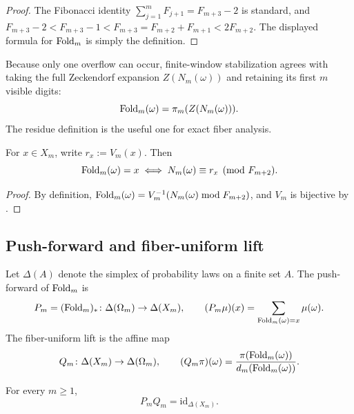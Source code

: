 \begin{proof}
The Fibonacci identity
\(\sum_{j=1}^m F_{j+1}=F_{m+3}-2\) is standard, and
\(F_{m+3}-2<F_{m+3}-1<F_{m+3}=F_{m+2}+F_{m+1}<2F_{m+2}\).  The displayed
formula for \(\mathrm{Fold}_m\) is simply the definition.
\end{proof}

\begin{remark}
\label{rem:prefix-normalization}
Because only one overflow can occur, finite-window stabilization agrees with
taking the full Zeckendorf expansion \(Z(N_m(\omega))\) and retaining its first
\(m\) visible digits:
\[
  \mathrm{Fold}_m(\omega)=\pi_m(Z(N_m(\omega))).
\]
The residue definition is the useful one for exact fiber analysis.
\end{remark}

\begin{corollary}
\label{cor:residue-characterization}
For \(x\in X_m\), write \(r_x:=V_m(x)\).  Then
\[
  \mathrm{Fold}_m(\omega)=x
  \iff
  N_m(\omega)\equiv r_x \pmod{F_{m+2}}.
\]
\end{corollary}

\begin{proof}
By definition,
\(\mathrm{Fold}_m(\omega)=V_m^{-1}(N_m(\omega)\bmod F_{m+2})\), and \(V_m\) is
bijective by .
\end{proof}

\subsection{Push-forward and fiber-uniform lift}

\begin{definition}
\label{def:pushforward-lift}
Let \(\Delta(A)\) denote the simplex of probability laws on a finite set \(A\).
The push-forward of \(\mathrm{Fold}_m\) is
\[
  P_m=(\mathrm{Fold}_m)_*\colon \Delta(\Omega_m)\to\Delta(X_m),
  \qquad
  (P_m\mu)(x)=\sum_{\mathrm{Fold}_m(\omega)=x}\mu(\omega).
\]
The fiber-uniform lift is the affine map
\[
  Q_m\colon \Delta(X_m)\to\Delta(\Omega_m),
  \qquad
  (Q_m\pi)(\omega)=\frac{\pi(\mathrm{Fold}_m(\omega))}{d_m(\mathrm{Fold}_m(\omega))}.
\]
\end{definition}

\begin{proposition}
\label{prop:split-epi}
For every \(m\ge 1\),
\[
  P_mQ_m=\mathrm{id}_{\Delta(X_m)}.
\]
\end{proposition}

